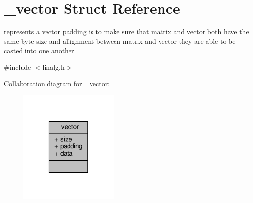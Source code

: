 \hypertarget{struct__vector}{\section{\-\_\-vector Struct Reference}
\label{struct__vector}
}


represents a vector padding is to make sure that matrix and vector both have the same byte size and allignment between matrix and vector they are able to be casted into one another  




{\ttfamily \#include $<$linalg.\-h$>$}



Collaboration diagram for \-\_\-vector\-:\nopagebreak
\begin{figure}[H]
\begin{center}
\leavevmode
\includegraphics[width=138pt]{struct__vector__coll__graph}
\end{center}
\end{figure}
